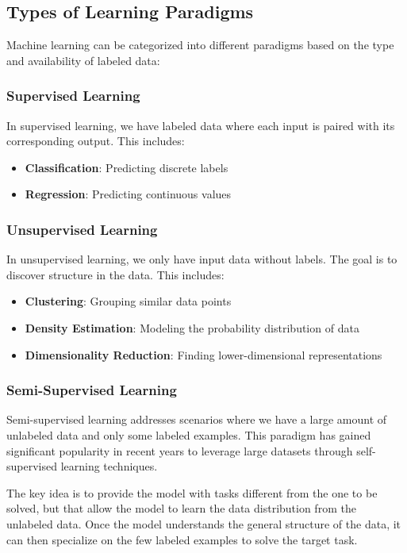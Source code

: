 \documentclass[11pt,a4paper]{article}
\theoremstyle{definition}
\theoremstyle{plain}
\theoremstyle{remark}
\begin{document}
\subsection{Types of Learning Paradigms}

Machine learning can be categorized into different paradigms based on the type and availability of labeled data:

\subsubsection{Supervised Learning}

In supervised learning, we have labeled data where each input is paired with its corresponding output. This includes:
\begin{itemize}
    \item \textbf{Classification}: Predicting discrete labels
    \item \textbf{Regression}: Predicting continuous values
\end{itemize}

\subsubsection{Unsupervised Learning}

In unsupervised learning, we only have input data without labels. The goal is to discover structure in the data. This includes:
\begin{itemize}
    \item \textbf{Clustering}: Grouping similar data points
    \item \textbf{Density Estimation}: Modeling the probability distribution of data
    \item \textbf{Dimensionality Reduction}: Finding lower-dimensional representations
\end{itemize}

\subsubsection{Semi-Supervised Learning}

Semi-supervised learning addresses scenarios where we have a large amount of unlabeled data and only some labeled examples. This paradigm has gained significant popularity in recent years to leverage large datasets through self-supervised learning techniques.

The key idea is to provide the model with tasks different from the one to be solved, but that allow the model to learn the data distribution from the unlabeled data. Once the model understands the general structure of the data, it can then specialize on the few labeled examples to solve the target task.
\end{document}
